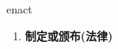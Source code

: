 
\begin{frame}
{\huge enact}
\begin{center}
\begin{enumerate}\Large
  \item \textbf{制定或颁布(法律)}
\end{enumerate}
\end{center}
\end{frame}
